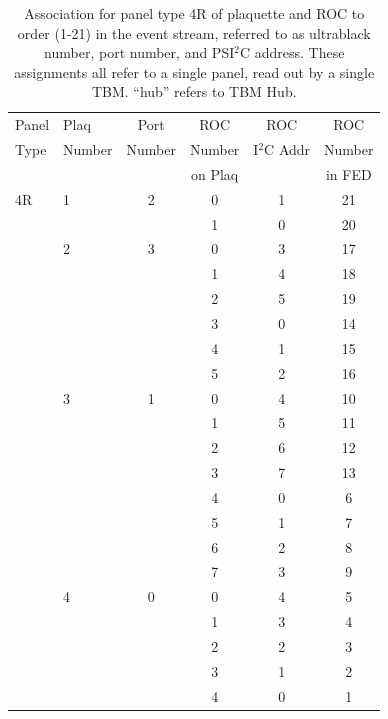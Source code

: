 \documentclass{cmspaper}
\begin{document}
\begin{appendix}
\begin{table}[htb]
    \caption{
Association for panel type 4R of plaquette and ROC to order
(1-21)  in the event stream, referred to as ultrablack number, port number, 
and PSI$^{2}$C address. These assignments all refer to a single panel, read 
out by a single TBM. ``hub'' refers to TBM Hub.
}
    \label{table:plaq_fed_4R}
    \begin{center}
      \begin{tabular}{l|l|cccc} \hline
Panel & Plaq & Port & ROC & ROC & ROC \\
Type  & Number & Number & Number & I$^2$C Addr & Number \\
      &        &        & on Plaq &            & in FED \\ \hline
4R & 1 & 2 &  0 & 1 & 21 \\
   &   &   &  1 & 0 & 20 \\
   & 2 & 3 &  0 & 3 & 17 \\
   &   &   &  1 & 4 & 18 \\
   &   &   &  2 & 5 & 19 \\
   &   &   &  3 & 0 & 14 \\
   &   &   &  4 & 1 & 15 \\
   &   &   &  5 & 2 & 16 \\
   & 3 & 1 &  0 & 4 & 10 \\
   &   &   &  1 & 5 & 11 \\
   &   &   &  2 & 6 & 12 \\
   &   &   &  3 & 7 & 13 \\
   &   &   &  4 & 0 &  6 \\
   &   &   &  5 & 1 &  7 \\
   &   &   &  6 & 2 &  8 \\
   &   &   &  7 & 3 &  9 \\
   & 4 & 0 &  0 & 4 &  5 \\
   &   &   &  1 & 3 &  4 \\
   &   &   &  2 & 2 &  3 \\
   &   &   &  3 & 1 &  2 \\
   &   &   &  4 & 0 &  1 \\
      \end{tabular}
    \end{center}
  \end{table}



\end{appendix}
\end{document}

